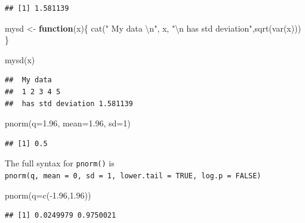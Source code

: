 \documentclass[
]{book}
\newenvironment{Shaded}{\begin{snugshade}}{\end{snugshade}}
\newcommand{\AttributeTok}[1]{\textcolor[rgb]{0.77,0.63,0.00}{#1}}
\newcommand{\ControlFlowTok}[1]{\textcolor[rgb]{0.13,0.29,0.53}{\textbf{#1}}}
\newcommand{\DecValTok}[1]{\textcolor[rgb]{0.00,0.00,0.81}{#1}}
\newcommand{\FloatTok}[1]{\textcolor[rgb]{0.00,0.00,0.81}{#1}}
\newcommand{\FunctionTok}[1]{\textcolor[rgb]{0.00,0.00,0.00}{#1}}
\newcommand{\NormalTok}[1]{#1}
\newcommand{\OtherTok}[1]{\textcolor[rgb]{0.56,0.35,0.01}{#1}}
\newcommand{\SpecialCharTok}[1]{\textcolor[rgb]{0.00,0.00,0.00}{#1}}
\newcommand{\StringTok}[1]{\textcolor[rgb]{0.31,0.60,0.02}{#1}}
\theoremstyle{definition}
\theoremstyle{definition}
\theoremstyle{definition}
\theoremstyle{definition}
\theoremstyle{remark}
\begin{document}
\begin{verbatim}
## [1] 1.581139
\end{verbatim}

\begin{Shaded}
\begin{Highlighting}[]
\NormalTok{mysd }\OtherTok{\textless{}{-}} \ControlFlowTok{function}\NormalTok{(x)\{}
  \FunctionTok{cat}\NormalTok{(}\StringTok{" My data }\SpecialCharTok{\textbackslash{}n}\StringTok{"}\NormalTok{, x, }\StringTok{"}\SpecialCharTok{\textbackslash{}n}\StringTok{ has std deviation"}\NormalTok{,}\FunctionTok{sqrt}\NormalTok{(}\FunctionTok{var}\NormalTok{(x)))}
\NormalTok{\}}


\FunctionTok{mysd}\NormalTok{(x)}
\end{Highlighting}
\end{Shaded}

\begin{verbatim}
##  My data 
##  1 2 3 4 5 
##  has std deviation 1.581139
\end{verbatim}

\begin{Shaded}
\begin{Highlighting}[]
\FunctionTok{pnorm}\NormalTok{(}\AttributeTok{q=}\FloatTok{1.96}\NormalTok{, }\AttributeTok{mean=}\FloatTok{1.96}\NormalTok{, }\AttributeTok{sd=}\DecValTok{1}\NormalTok{)}
\end{Highlighting}
\end{Shaded}

\begin{verbatim}
## [1] 0.5
\end{verbatim}

The full syntax for \texttt{pnorm()} is \texttt{pnorm(q,\ mean\ =\ 0,\ sd\ =\ 1,\ lower.tail\ =\ TRUE,\ log.p\ =\ FALSE)}

\begin{Shaded}
\begin{Highlighting}[]
\FunctionTok{pnorm}\NormalTok{(}\AttributeTok{q=}\FunctionTok{c}\NormalTok{(}\SpecialCharTok{{-}}\FloatTok{1.96}\NormalTok{,}\FloatTok{1.96}\NormalTok{))}
\end{Highlighting}
\end{Shaded}

\begin{verbatim}
## [1] 0.0249979 0.9750021
\end{verbatim}
\end{document}
